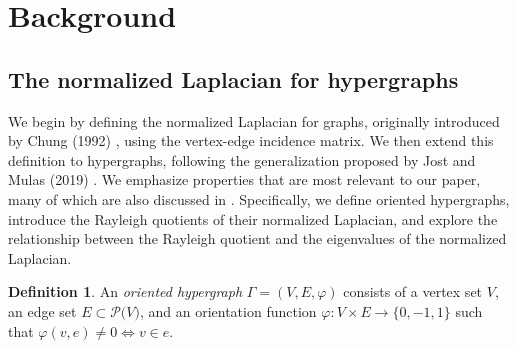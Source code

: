 \documentclass{article}
\theoremstyle{plain}
\theoremstyle{definition}
\newtheorem{definition}[theorem]{Definition}
\theoremstyle{remark}
\begin{document}



\section{Background}



\subsection{The normalized Laplacian for hypergraphs}
We begin by defining the normalized Laplacian for graphs, originally introduced by Chung (1992) \cite{chung}, using the vertex-edge incidence matrix. We then extend this definition to hypergraphs, following the generalization proposed by Jost and Mulas (2019) \cite{JostMulas2019}. We emphasize properties that are most relevant to our paper, many of which are also discussed in \cite{JostMulas2019,Mulas2021,mulas2022hypergraphs,AndreottiMulas2022,Mulas-Cheeger}.
Specifically, we define oriented hypergraphs, introduce the Rayleigh quotients of their normalized Laplacian, and explore the relationship between the Rayleigh quotient and the eigenvalues of the normalized Laplacian.
\begin{definition}\label{def:orientedhypergph}
    An \emph{oriented hypergraph} $\Gamma = (V, E,\varphi)$ consists of a vertex set $V$, an edge set $E \subset \mathcal P\bigl(V\bigr)$, and an orientation function $\varphi\colon V\times E \to \{0,-1,1\}$ such that $\varphi(v,e)\neq 0 \iff v\in e$.
\end{definition}
\end{document}
